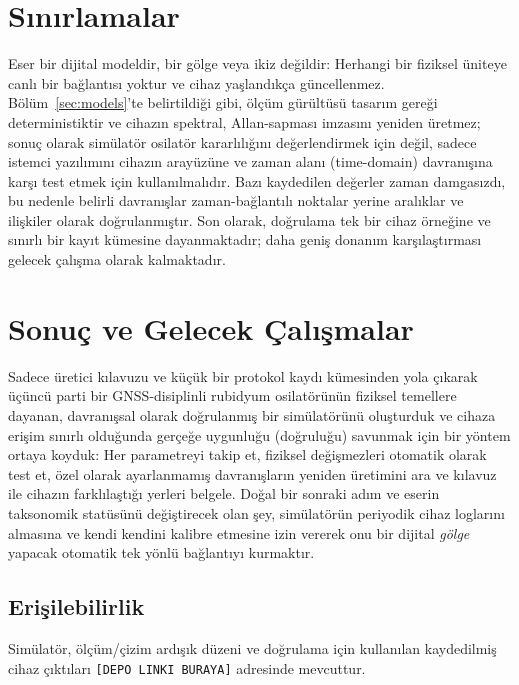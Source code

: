 \documentclass[9pt,twocolumn,a4paper]{extarticle}
\begin{document}
\section{Sınırlamalar}
Eser bir dijital modeldir, bir gölge veya ikiz değildir: Herhangi bir fiziksel üniteye canlı bir bağlantısı yoktur ve cihaz yaşlandıkça güncellenmez. Bölüm~\ref{sec:models}'te belirtildiği gibi, ölçüm gürültüsü tasarım gereği deterministiktir ve cihazın spektral, Allan-sapması imzasını yeniden üretmez; sonuç olarak simülatör osilatör kararlılığını değerlendirmek için değil, sadece istemci yazılımını cihazın arayüzüne ve zaman alanı (time-domain) davranışına karşı test etmek için kullanılmalıdır. Bazı kaydedilen değerler zaman damgasızdı, bu nedenle belirli davranışlar zaman-bağlantılı noktalar yerine aralıklar ve ilişkiler olarak doğrulanmıştır. Son olarak, doğrulama tek bir cihaz örneğine ve sınırlı bir kayıt kümesine dayanmaktadır; daha geniş donanım karşılaştırması gelecek çalışma olarak kalmaktadır.

\section{Sonuç ve Gelecek Çalışmalar}
Sadece üretici kılavuzu ve küçük bir protokol kaydı kümesinden yola çıkarak üçüncü parti bir GNSS-disiplinli rubidyum osilatörünün fiziksel temellere dayanan, davranışsal olarak doğrulanmış bir simülatörünü oluşturduk ve cihaza erişim sınırlı olduğunda gerçeğe uygunluğu (doğruluğu) savunmak için bir yöntem ortaya koyduk: Her parametreyi takip et, fiziksel değişmezleri otomatik olarak test et, özel olarak ayarlanmamış davranışların yeniden üretimini ara ve kılavuz ile cihazın farklılaştığı yerleri belgele. Doğal bir sonraki adım ve eserin taksonomik statüsünü değiştirecek olan şey, simülatörün periyodik cihaz loglarını almasına ve kendi kendini kalibre etmesine izin vererek onu bir dijital \emph{gölge} yapacak otomatik tek yönlü bağlantıyı kurmaktır.

\subsection*{Erişilebilirlik}
Simülatör, ölçüm/çizim ardışık düzeni ve doğrulama için kullanılan kaydedilmiş cihaz çıktıları
\texttt{[DEPO LINKI BURAYA]} adresinde mevcuttur.

\end{document}
